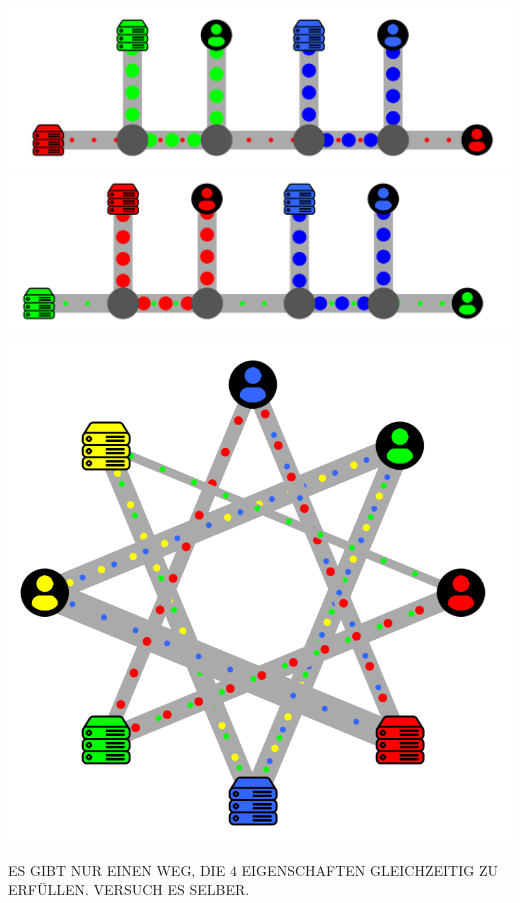 \documentclass[pageborders]{zibposter}
\begin{document}
{      \begin{minipage}[c]{0.45\linewidth}
      \centering
      \includegraphics[width=0.95\linewidth] {graphics/axiom1.png}
      \includegraphics[width=0.95\linewidth] {graphics/axiom1b.png}
      \includegraphics[width=0.95\linewidth] {graphics/octagon_white_background.png}

      \begin{minipage}[c]{0.8\linewidth}
      \begin{center}
          {\LARGE ES GIBT NUR EINEN WEG, DIE $4$ EIGENSCHAFTEN GLEICHZEITIG ZU ERFÜLLEN. VERSUCH ES SELBER.}


\end{center}
\end{minipage}
\end{minipage}}
\end{document}
